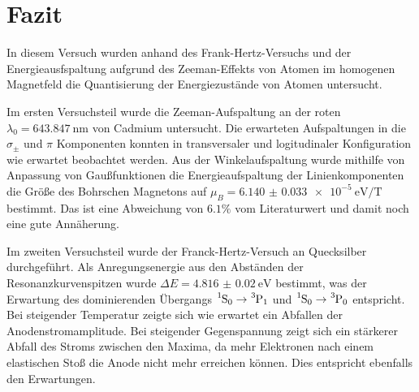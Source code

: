\section{Fazit}

In diesem Versuch wurden anhand des Frank-Hertz-Versuchs und der Energieausfspaltung aufgrund des Zeeman-Effekts von Atomen im homogenen Magnetfeld die Quantisierung der Energiezustände von Atomen untersucht.

Im ersten Versuchsteil wurde die Zeeman-Aufspaltung an der roten $\lambda_0=\SI{643.847}{\nano\meter}$ von Cadmium untersucht. Die erwarteten Aufspaltungen in die $\sigma_\pm$ und $\pi$ Komponenten konnten in transversaler und logitudinaler Konfiguration wie erwartet beobachtet werden. Aus der Winkelaufspaltung wurde mithilfe von Anpassung von Gaußfunktionen die Energieaufspaltung der Linienkomponenten die Größe des Bohrschen Magnetons auf $\mu_B=\SI{6.140(33)e-5}{\eV\per\tesla}$ bestimmt. Das ist eine Abweichung von $6.1\%$ vom Literaturwert und damit noch eine gute Annäherung.

Im zweiten Versuchsteil wurde der Franck-Hertz-Versuch an Quecksilber durchgeführt. Als Anregungsenergie aus den Abständen der Resonanzkurvenspitzen wurde $\Delta E = \SI{4.816(20)}{\electronvolt}$ bestimmt, was der Erwartung des dominierenden Übergangs $\ce{^1S_0} \rightarrow \ce{^3P_1}$ und $\ce{^1S_0} \rightarrow \ce{^3P_0}$ entspricht. Bei steigender Temperatur zeigte sich wie erwartet ein Abfallen der Anodenstromamplitude. Bei steigender Gegenspannung zeigt sich ein stärkerer Abfall des Stroms zwischen den Maxima, da mehr Elektronen nach einem elastischen Stoß die Anode nicht mehr erreichen können. Dies entspricht ebenfalls den Erwartungen.
